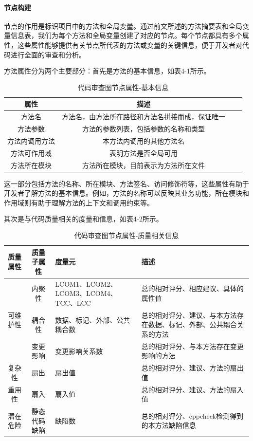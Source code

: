 \paragraph{节点构建} 节点的作用是标识项目中的方法和全局变量。通过前文所述的方法摘要表和全局变量信息表，我们为每个方法和全局变量创建了对应的节点。每个节点都具有多个属性，这些属性能够提供有关节点所代表的方法或变量的关键信息，便于开发者对代码进行全面的审查和分析。



方法属性分为两个主要部分：首先是方法的基本信息，如表4-1所示。

\begin{table}[htbp]
\caption{代码审查图节点属性-基本信息}
\vspace{0.5em}\centering\wuhao
\begin{tabular}{cccc}
\toprule
    属性 & 描述 \\
\midrule
方法名 & 方法名，由方法所在路径和方法名拼接而成，保证唯一  \\
方法参数 & 方法的参数列表，包括参数的名称和类型   \\
方法内调用方法 & 本方法内调用的其他方法名   \\
方法可作用域 & 表明方法是否全局可用   \\
方法所在模块 &  方法所在模块，目前表示为方法所在文件  \\ 
\bottomrule
\end{tabular}
\end{table}

这一部分包括方法的名称、所在模块、方法签名、访问修饰符等，这些属性有助于开发者了解方法的基本信息。例如，方法的名称可以反映其业务功能，所在模块和作用域则有助于理解方法的上下文和调用约束等。

其次是与代码质量相关的度量和信息，如表4-2所示。

\begin{table}[htbp]
    \caption{代码审查图节点属性-质量相关信息}
    \vspace{0.5em}\centering\wuhao
    \begin{tabular}{ccp{5cm}p{5cm}}
    \toprule
    质量属性& 质量子属性 & 度量元 & 描述 \\
    \midrule
    
    \multirow{3}{*}{可维护性} 
    & 内聚性& LCOM1、LCOM2、LCOM3、LCOM4、TCC、LCC &  总的相对评分、相应建议、具体的属性值 \\           
    & 耦合性& 数据、标记、外部、公共耦合数 &  总的相对评分、建议、与本方法存在数据、标记、外部、公共耦合关系的方法 \\       
    & 变更影响 & 变更影响关系数 & 总的相对评分、与本方法存在变更影响的方法 \\  \cline{2-4}
    复杂性 & 扇出 &扇出值 &  总的相对评分、建议、方法的扇出值 \\  \cline{2-4}
    重用性 & 扇入 &扇入值 &  总的相对评分、建议、方法的扇入值 \\  \cline{2-4}
    潜在危险 & 静态代码缺陷 & 缺陷数 &  总的相对评分、cppcheck检测得到的本方法缺陷信息 \\      
    \bottomrule
    \end{tabular}
    \end{table}

